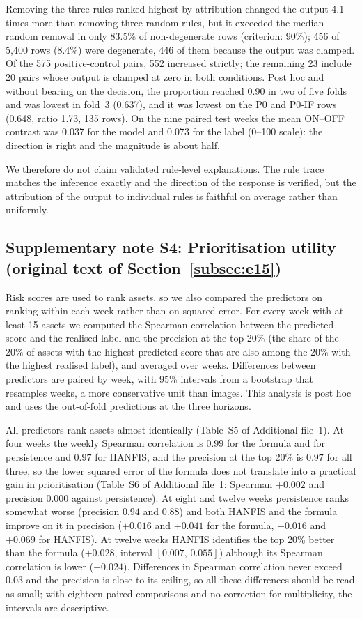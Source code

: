\documentclass[pdflatex,sn-basic]{sn-jnl}
\theoremstyle{thmstyleone}%
\theoremstyle{thmstyletwo}%
\theoremstyle{thmstylethree}%
\begin{document}
Removing the three rules ranked highest by attribution changed the output 4.1 times more than removing three random rules, but it exceeded the median random removal in only 83.5\% of non-degenerate rows (criterion: 90\%); 456 of 5{,}400 rows (8.4\%) were degenerate, 446 of them because the output was clamped. Of the 575 positive-control pairs, 552 increased strictly; the remaining 23 include 20 pairs whose output is clamped at zero in both conditions. Post hoc and without bearing on the decision, the proportion reached 0.90 in two of five folds and was lowest in fold~3 (0.637), and it was lowest on the P0 and P0-IF rows (0.648, ratio 1.73, 135 rows). On the nine paired test weeks the mean ON--OFF contrast was 0.037 for the model and 0.073 for the label (0--100 scale): the direction is right and the magnitude is about half.

We therefore do not claim validated rule-level explanations. The rule trace matches the inference exactly and the direction of the response is verified, but the attribution of the output to individual rules is faithful on average rather than uniformly.

\subsection*{Supplementary note S4: Prioritisation utility (original text of Section~\ref{subsec:e15})}
Risk scores are used to rank assets, so we also compared the predictors on ranking within each week rather than on squared error. For every week with at least 15 assets we computed the Spearman correlation between the predicted score and the realised label and the precision at the top 20\% (the share of the 20\% of assets with the highest predicted score that are also among the 20\% with the highest realised label), and averaged over weeks. Differences between predictors are paired by week, with 95\% intervals from a bootstrap that resamples weeks, a more conservative unit than images. This analysis is post hoc and uses the out-of-fold predictions at the three horizons.

All predictors rank assets almost identically (Table~S5 of Additional file~1). At four weeks the weekly Spearman correlation is $0.99$ for the formula and for persistence and $0.97$ for HANFIS, and the precision at the top 20\% is $0.97$ for all three, so the lower squared error of the formula does not translate into a practical gain in prioritisation (Table~S6 of Additional file~1: Spearman $+0.002$ and precision $0.000$ against persistence). At eight and twelve weeks persistence ranks somewhat worse (precision $0.94$ and $0.88$) and both HANFIS and the formula improve on it in precision ($+0.016$ and $+0.041$ for the formula, $+0.016$ and $+0.069$ for HANFIS). At twelve weeks HANFIS identifies the top 20\% better than the formula ($+0.028$, interval $[0.007,\,0.055]$) although its Spearman correlation is lower ($-0.024$). Differences in Spearman correlation never exceed $0.03$ and the precision is close to its ceiling, so all these differences should be read as small; with eighteen paired comparisons and no correction for multiplicity, the intervals are descriptive.
\end{document}
